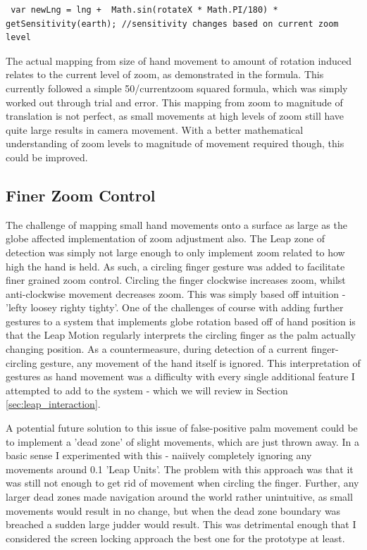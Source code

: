 \documentclass{sigplanconf}
\begin{document}
\begin{lstlisting}
 var newLng = lng +  Math.sin(rotateX * Math.PI/180) * getSensitivity(earth); //sensitivity changes based on current zoom level
\end{lstlisting}


The actual mapping from size of hand movement to amount of rotation induced relates to the current level of zoom, as demonstrated in the formula. This currently followed a simple 50/currentzoom squared formula, which was simply worked out through trial and error. This mapping from zoom to magnitude of translation is not perfect, as small movements at high levels of zoom still have quite large results in camera movement. With a better mathematical understanding of zoom levels to magnitude of movement required though, this could be improved. 

\subsection{Finer Zoom Control}

The challenge of mapping small hand movements onto a surface as large as the globe affected implementation of zoom adjustment also. The Leap zone of detection was simply not large enough to only implement zoom related to how high the hand is held. As such, a circling finger gesture was added to facilitate finer grained zoom control. Circling the finger clockwise increases zoom, whilst anti-clockwise movement decreases zoom. This was simply based off intuition - 'lefty loosey righty tighty'. One of the challenges of course with adding further gestures to a system that implements globe rotation based off of hand position is that the Leap Motion regularly interprets the circling finger as the palm actually changing position. As a countermeasure, during detection of a current finger-circling gesture, any movement of the hand itself is ignored. This interpretation of gestures as hand movement was a difficulty with every single additional feature I attempted to add to the system - which we will review in Section \ref{sec:leap_interaction}.

A potential future solution to this issue of false-positive palm movement could be to implement a 'dead zone' of slight movements, which are just thrown away. In a basic sense I experimented with this - naiively completely ignoring any movements around 0.1 'Leap Units'. The problem with this approach was that it was still not enough to get rid of movement when circling the finger. Further, any larger dead zones made navigation around the world rather unintuitive, as small movements would result in no change, but when the dead zone boundary was breached a sudden large judder would result. This was detrimental enough that I considered the screen locking approach the best one for the prototype at least.
\end{document}
